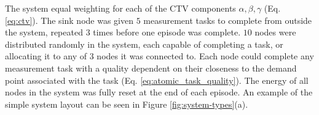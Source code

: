 The \simulationSimple{}{} system  equal weighting for each of the CTV components $\alpha, \beta, \gamma$ (Eq. \ref{eq:ctv}). The sink node was given $5$ measurement tasks to complete from outside the system, repeated $3$ times before one episode was complete. $10$ nodes were distributed randomly in the system, each capable of completing a task, or allocating it to any of $3$ nodes it was connected to. Each node could complete any measurement task with a quality dependent on their closeness to the demand point associated with the task (Eq. \ref{eq:atomic_task_quality}). The energy of all nodes in the system was fully reset at the end of each episode. An example of the simple system layout can be seen in Figure \ref{fig:system-types}(a). 
